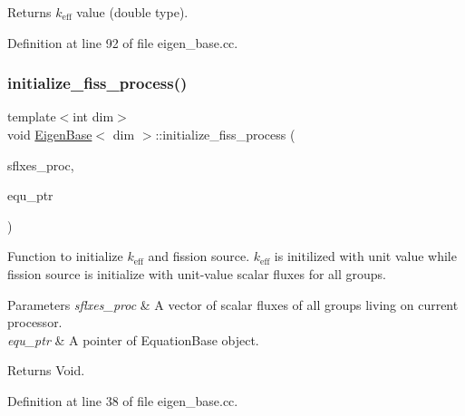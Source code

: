 \begin{DoxyReturn}{Returns}
$k_\mathrm{eff}$ value (double type). 
\end{DoxyReturn}


Definition at line 92 of file eigen\+\_\+base.\+cc.

\mbox{\label{class_eigen_base_a982ceb033a4452633c612491544ab100}} 
\subsubsection{\texorpdfstring{initialize\+\_\+fiss\+\_\+process()}{initialize\_fiss\_process()}}
{\footnotesize\ttfamily template$<$int dim$>$ \\
void \hyperlink{class_eigen_base}{Eigen\+Base}$<$ dim $>$\+::initialize\+\_\+fiss\+\_\+process (\begin{DoxyParamCaption}\item[{std\+::vector$<$ Vector$<$ double $>$ $>$ \&}]{sflxes\+\_\+proc,  }\item[{std\+\_\+cxx11\+::shared\+\_\+ptr$<$ \hyperlink{class_equation_base}{Equation\+Base}$<$ dim $>$ $>$ \&}]{equ\+\_\+ptr }\end{DoxyParamCaption})\hspace{0.3cm}{\ttfamily [protected]}}

Function to initialize $k_\mathrm{eff}$ and fission source. $k_\mathrm{eff}$ is initilized with unit value while fission source is initialize with unit-\/value scalar fluxes for all groups.


\begin{DoxyParams}{Parameters}
{\em sflxes\+\_\+proc} & A vector of scalar fluxes of all groups living on current processor. \\
\hline
{\em equ\+\_\+ptr} & A pointer of Equation\+Base object. \\
\hline
\end{DoxyParams}
\begin{DoxyReturn}{Returns}
Void. 
\end{DoxyReturn}


Definition at line 38 of file eigen\+\_\+base.\+cc.

\mbox{\label{class_eigen_base_aa51c202e12e88c70652aefbe4d399f2b}} 
